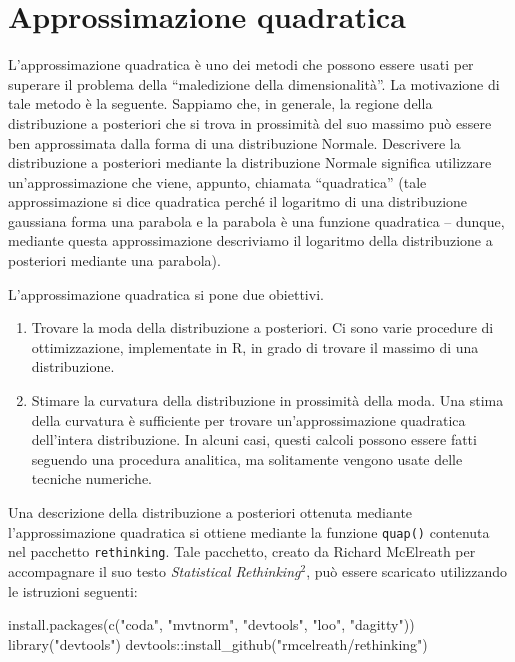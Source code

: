\documentclass[
]{memoir}
\newenvironment{Shaded}{\begin{snugshade}}{\end{snugshade}}
\newcommand{\FunctionTok}[1]{\textcolor[rgb]{0.00,0.00,0.00}{#1}}
\newcommand{\NormalTok}[1]{#1}
\newcommand{\SpecialCharTok}[1]{\textcolor[rgb]{0.00,0.00,0.00}{#1}}
\newcommand{\StringTok}[1]{\textcolor[rgb]{0.31,0.60,0.02}{#1}}
\begin{document}
\hypertarget{approssimazione-quadratica}{%
\section{Approssimazione quadratica}\label{approssimazione-quadratica}}

L'approssimazione quadratica è uno dei metodi che possono essere usati per superare il problema della ``maledizione della dimensionalità''. La motivazione di tale metodo è la seguente. Sappiamo che, in generale, la regione della distribuzione a posteriori che si trova in prossimità del suo massimo può essere ben approssimata dalla forma di una distribuzione Normale. Descrivere la distribuzione a posteriori mediante la distribuzione Normale significa utilizzare un'approssimazione che viene, appunto, chiamata ``quadratica'' (tale approssimazione si dice quadratica perché il logaritmo di una distribuzione gaussiana forma una parabola e la parabola è una funzione quadratica -- dunque, mediante questa approssimazione descriviamo il logaritmo della distribuzione a posteriori mediante una parabola).

L'approssimazione quadratica si pone due obiettivi.

\begin{enumerate}
\def\labelenumi{\arabic{enumi}.}
\item
  Trovare la moda della distribuzione a posteriori. Ci sono varie
  procedure di ottimizzazione, implementate in R, in
  grado di trovare il massimo di una distribuzione.
\item
  Stimare la curvatura della distribuzione in prossimità della moda.
  Una stima della curvatura è sufficiente per trovare
  un'approssimazione quadratica dell'intera distribuzione. In alcuni
  casi, questi calcoli possono essere fatti seguendo una procedura
  analitica, ma solitamente vengono usate delle tecniche numeriche.
\end{enumerate}

Una descrizione della distribuzione a posteriori ottenuta mediante l'approssimazione quadratica si ottiene mediante la funzione \texttt{quap()} contenuta nel pacchetto \texttt{rethinking}. Tale pacchetto, creato da Richard McElreath per accompagnare il suo testo \emph{Statistical Rethinking}\(^2\), può essere scaricato utilizzando le istruzioni seguenti:

\begin{Shaded}
\begin{Highlighting}[]
\FunctionTok{install.packages}\NormalTok{(}\FunctionTok{c}\NormalTok{(}\StringTok{"coda"}\NormalTok{, }\StringTok{"mvtnorm"}\NormalTok{, }\StringTok{"devtools"}\NormalTok{, }\StringTok{"loo"}\NormalTok{, }\StringTok{"dagitty"}\NormalTok{))}
\FunctionTok{library}\NormalTok{(}\StringTok{"devtools"}\NormalTok{)}
\NormalTok{devtools}\SpecialCharTok{::}\FunctionTok{install\_github}\NormalTok{(}\StringTok{"rmcelreath/rethinking"}\NormalTok{)}
\end{Highlighting}
\end{Shaded}
\end{document}
